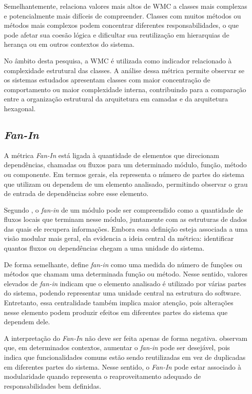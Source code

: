 Semelhantemente,  relaciona valores mais altos de WMC a classes mais complexas e potencialmente 
mais difíceis de compreender. Classes com muitos métodos ou métodos mais complexos podem concentrar diferentes responsabilidades, 
o que pode afetar sua coesão lógica e dificultar sua reutilização em hierarquias de herança ou em outros contextos do sistema.

No âmbito desta pesquisa, a WMC é utilizada como indicador relacionado à complexidade estrutural das classes. A análise dessa 
métrica permite observar se os sistemas estudados apresentam classes com maior concentração de comportamento ou maior complexidade
interna, contribuindo para a comparação entre a organização estrutural da arquitetura em camadas e da arquitetura hexagonal.

\subsection{\textit{Fan-In}}
\label{sec:fan-in}

A métrica \textit{Fan-In} está ligada à quantidade de elementos que direcionam dependências, chamadas ou fluxos para um
determinado módulo, função, método ou componente. Em termos gerais, ela representa o número de partes do sistema que utilizam 
ou dependem de um elemento analisado, permitindo observar o grau de entrada de dependências sobre esse elemento.

Segundo , o \textit{fan-in} de um módulo pode ser compreendido como a quantidade de fluxos locais que 
terminam nesse módulo, juntamente com as estruturas de dados das quais ele recupera informações. Embora essa definição esteja 
associada a uma visão modular mais geral, ela evidencia a ideia central da métrica: identificar quantos fluxos ou dependências 
chegam a uma unidade do sistema.

De forma semelhante,  define \textit{fan-in} como uma medida do número de funções ou métodos que 
chamam uma determinada função ou método. Nesse sentido, valores elevados de \textit{fan-in} indicam que o elemento analisado 
é utilizado por várias partes do sistema, podendo representar uma unidade central na estrutura do software. Entretanto, essa 
centralidade também implica maior atenção, pois alterações nesse elemento podem produzir efeitos em diferentes partes do sistema 
que dependem dele.

A interpretação do \textit{Fan-In} não deve ser feita apenas de forma negativa.  observam que, em determinados 
contextos, aumentar o \textit{fan-in} pode ser desejável, pois indica que funcionalidades comuns estão sendo reutilizadas em vez de 
duplicadas em diferentes partes do sistema. Nesse sentido, o \textit{Fan-In} pode estar associado à modularidade quando representa o 
reaproveitamento adequado de responsabilidades bem definidas.

